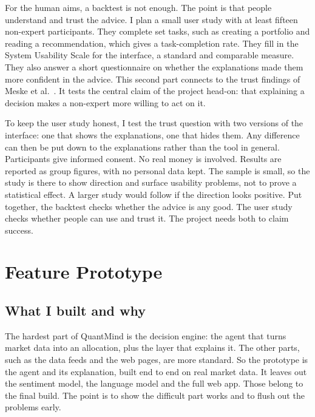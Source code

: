 \documentclass[12pt,twoside,letterpaper]{article}
\begin{document}
For the human aims, a backtest is not enough. The point is that people understand
and trust the advice. I plan a small user study with at least fifteen non-expert
participants. They complete set tasks, such as creating a portfolio and reading a
recommendation, which gives a task-completion rate. They fill in the System
Usability Scale for the interface, a standard and comparable measure. They also
answer a short questionnaire on whether the explanations made them more confident in
the advice. This second part connects to the trust findings of Meske et al.\
\cite{meske2022}. It tests the central claim of the project head-on: that explaining
a decision makes a non-expert more willing to act on it.

To keep the user study honest, I test the trust question with two versions of the
interface: one that shows the explanations, one that hides them. Any difference can
then be put down to the explanations rather than the tool in general. Participants
give informed consent. No real money is involved. Results are reported as group
figures, with no personal data kept. The sample is small, so the study is there to
show direction and surface usability problems, not to prove a statistical effect. A
larger study would follow if the direction looks positive. Put together, the
backtest checks whether the advice is any good. The user study checks whether people
can use and trust it. The project needs both to claim success.

\section{Feature Prototype}

\subsection{What I built and why}

The hardest part of QuantMind is the decision engine: the agent that turns market
data into an allocation, plus the layer that explains it. The other parts, such as
the data feeds and the web pages, are more standard. So the prototype is the agent
and its explanation, built end to end on real market data. It leaves out the
sentiment model, the language model and the full web app. Those belong to the final
build. The point is to show the difficult part works and to flush out the problems
early.
\end{document}
